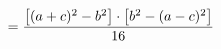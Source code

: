 \documentclass[preview]{standalone}
\begin{document}
\begin{align*}
\special{dvisvgm:raw <g id='unique000'>}= \frac{\bigl[(a+c)^2-b^2\bigr]\cdot\bigl[b^2-(a-c)^2\bigr]}{16}\special{dvisvgm:raw </g>}
\end{align*}
\end{document}
